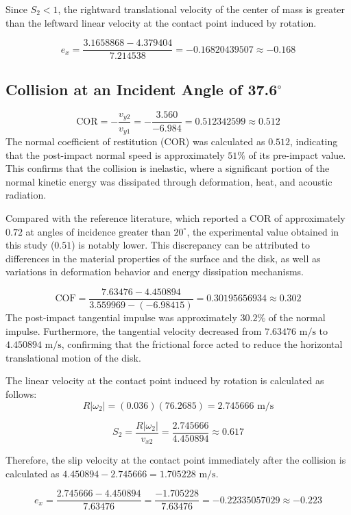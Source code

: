 \documentclass[11pt,letterpaper]{article}
\begin{document}
\vspace{1em}
\noindent Since $S_2 < 1$, the rightward translational velocity of the center of mass is greater than the leftward linear velocity at the contact point induced by rotation.

$$ e_x = \frac{3.1658868 - 4.379404}{7.214538} = -0.16820439507 \approx -0.168 $$
\subsection{Collision at an Incident Angle of 37.6$^\circ$}
$$ \text{COR} = -\frac{v_{y2}}{v_{y1}} = -\frac{3.560}{-6.984} = 0.512342599 \approx 0.512 $$
The normal coefficient of restitution ($\text{COR}$) was calculated as $0.512$, indicating that the post-impact normal speed is approximately $51\%$ of its pre-impact value. This confirms that the collision is inelastic, where a significant portion of the normal kinetic energy was dissipated through deformation, heat, and acoustic radiation.

Compared with the reference literature, which reported a $\text{COR}$ of approximately $0.72$ at angles of incidence greater than $20^\circ$, the experimental value obtained in this study ($0.51$) is notably lower. This discrepancy can be attributed to differences in the material properties of the surface and the disk, as well as variations in deformation behavior and energy dissipation mechanisms.

$$ \text{COF} = \frac{7.63476 - 4.450894}{3.559969 - (-6.98415)} = 0.30195656934 \approx 0.302 $$
The post-impact tangential impulse was approximately $30.2\%$ of the normal impulse. Furthermore, the tangential velocity decreased from $7.63476\text{ m/s}$ to $4.450894\text{ m/s}$, confirming that the frictional force acted to reduce the horizontal translational motion of the disk.

\noindent The linear velocity at the contact point induced by rotation is calculated as follows:
$$ R|\omega_2| = (0.036)(76.2685) = 2.745666 \text{ m/s} $$

\vspace{1em}
$$ S_2 = \frac{R|\omega_2|}{v_{x2}} = \frac{2.745666}{4.450894} \approx 0.617 $$

\vspace{1em}
\noindent Therefore, the slip velocity at the contact point immediately after the collision is calculated as $4.450894 - 2.745666 = 1.705228\text{ m/s}$.

$$ e_x = \frac{2.745666 - 4.450894}{7.63476} = \frac{-1.705228}{7.63476} = -0.22335057029 \approx -0.223 $$
\end{document}
